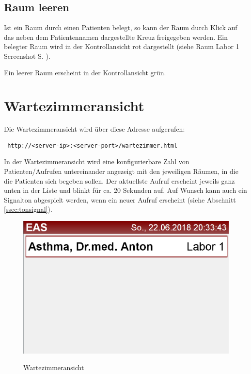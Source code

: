 \documentclass[a4paper,10pt]{scrreprt}
\begin{document}
\section{Raum leeren}
Ist ein Raum durch einen Patienten belegt, so kann der Raum durch Klick auf das neben dem Patientennamen dargestellte Kreuz freigegeben werden. Ein belegter Raum wird in der Kontrollansicht rot dargestellt (siehe Raum \glqq{}Labor 1\grqq{} Screenshot S. \pageref{controlinterface}).

Ein leerer Raum erscheint in der Kontrollansicht grün.

\chapter{Wartezimmeransicht}
Die Wartezimmeransicht wird über diese Adresse aufgerufen:
\begin{lstlisting}
 http://<server-ip>:<server-port>/wartezimmer.html
\end{lstlisting}

In der Wartezimmeransicht wird eine konfigurierbare Zahl von Patienten/Aufrufen untereinander angezeigt mit den jeweiligen Räumen, in die die Patienten sich begeben sollen. Der aktuellste Aufruf erscheint jeweils ganz unten in der Liste und blinkt für ca. 20 Sekunden auf. Auf Wunsch kann auch ein Signalton abgespielt werden,
wenn ein neuer Aufruf erscheint (siehe Abschnitt \ref{ssec:tonsignal}).

\begin{figure}[h]
 \centering
 \includegraphics[width=\textwidth]{./Screenshot-Wartezimmer.png}
 \label{controlinterface}
 \caption{Wartezimmeransicht}
\end{figure}
\end{document}
